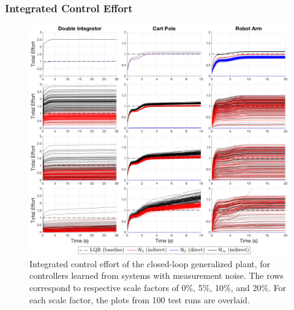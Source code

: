 \subsubsection{Integrated Control Effort}
\begin{figure}[H]
\centering
	\includegraphics[width=\textwidth]{figures/noise_integrated_effort3.png}
\caption{Integrated control effort of the closed-loop generalized plant, for controllers learned from systems with measurement noise.  The rows correspond to respective scale factors of 0\%, 5\%, 10\%, and 20\%.  For each scale factor, the plots from 100 test runs are overlaid.}
\label{fig:noise_integrated_effort3}
\end{figure}

\newpage

